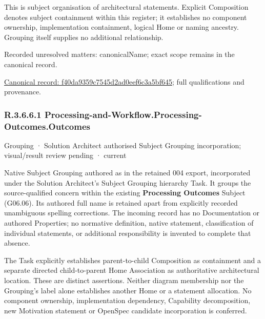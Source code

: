 This is subject organisation of architectural statements. Explicit Composition denotes subject containment within this register; it establishes no component ownership, implementation containment, logical Home or naming ancestry. Grouping itself supplies no additional relationship.


{\small Recorded unresolved matters: canonicalName; exact scope remains in the canonical record.}\par
{\footnotesize \href{../../../../continuum/grouping/f40da9359c7545d2ad0eef6c3a5bf645.md}{Canonical record: f40da9359c7545d2ad0eef6c3a5bf645}; full qualifications and provenance.}\par
\subsubsection*{R.3.6.6.1 Processing-and-Workflow.Processing-Outcomes.Outcomes}
\label{navigation:R.3.6.6.1}

\label{element:b05d68295ed141d6815aa56c8a3d3b39}
{\small Grouping · Solution Architect authorised Subject Grouping incorporation; visual/result review pending · current}\par

Native Subject Grouping authored as \texttt{} in the retained 004 export,
incorporated under the Solution Architect's Subject Grouping hierarchy Task.
It groups the source-qualified \texttt{} concern within
the existing \textbf{Processing Outcomes} Subject (G06.06). Its authored full name
is retained apart from explicitly recorded unambiguous spelling corrections.
The incoming record has no Documentation or authored Properties; no normative
definition, native statement, classification of individual statements, or
additional responsibility is invented to complete that absence.



The Task explicitly establishes parent-to-child Composition as containment and
a separate directed child-to-parent Home Association as authoritative architectural
location. These are distinct assertions. Neither diagram membership nor the
Grouping's label alone establishes another Home or a statement allocation.
No component ownership, implementation dependency, Capability decomposition,
new Motivation statement or OpenSpec candidate incorporation is conferred.




